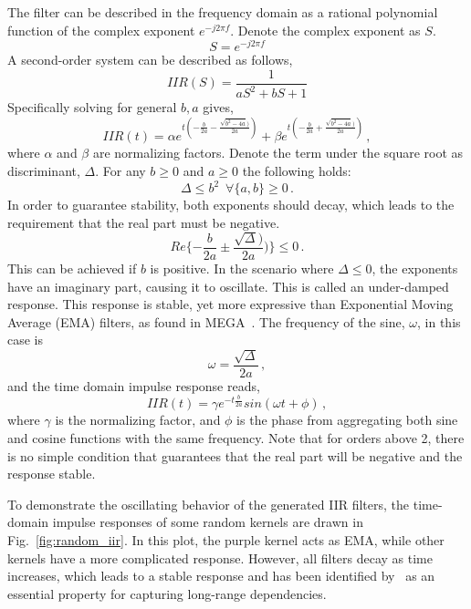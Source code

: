 \documentclass[11pt]{article}
\begin{document}
The filter can be described in the frequency domain as a rational polynomial function of the complex exponent $e^{-j2\pi f}$. Denote the complex exponent as $S$. 
\begin{equation}
    S = e^{-j2\pi f}
\end{equation}
A second-order system can be described as follows,
\begin{equation}
    IIR(S) = \frac{1}{aS^2 + bS + 1}
    \label{eq:iir_filter_s_plane}
\end{equation}
Specifically solving for general $b,a$ gives,
\begin{equation}
    IIR(t) = \alpha e^{t(-\frac{b}{2a}-\frac{\sqrt{b^2 - 4a})}{2a})} +\beta e^{t(-\frac{b}{2a} +\frac{\sqrt{b^2 - 4a})}{2a})}\,,
\end{equation}
where $\alpha$ and $\beta$ are normalizing factors. Denote the term under the square root as discriminant, $\Delta$. For any $b\geq0$ and $a\geq0$ the following holds:
\begin{equation}
    \Delta\leq b^2 \,\,\, \forall \{a,b\}\geq 0\,.
    \label{eq:delta_ineq}
\end{equation}
In order to guarantee stability, both exponents should decay, which leads to the requirement that the real part must be negative.
\begin{equation}
    Re\{-\frac{b}{2a}\pm\frac{\sqrt{\Delta})}{2a})\} \leq 0\,.
\end{equation}
This can be achieved if $b$ is positive. 
In the scenario where $\Delta \leq 0$, the exponents have an imaginary part, causing it to oscillate.  This is called an under-damped response.
This response is stable, yet more expressive than Exponential Moving Average (EMA) filters, as found in MEGA~\cite{ma2022mega}.
The frequency of the sine, $\omega$, in this case is
\begin{equation}
    \omega = \frac{\sqrt{\Delta}}{2a}\,,
    \label{eq:freq_sine}
\end{equation} 
and the time domain impulse response reads,
\begin{equation}
    IIR(t) = \gamma e^{-t\frac{b}{2a}}sin(\omega t+\phi)\,,
\end{equation}
where $\gamma$ is the normalizing factor, and $\phi$ is the phase from aggregating both sine and cosine functions with the same frequency. 
Note that for orders above 2, there is no simple condition that guarantees that the real part will be negative and the response stable.

To demonstrate the oscillating behavior of the generated IIR filters, the time-domain impulse responses of some random kernels are drawn in Fig.~\ref{fig:random_iir}. In this plot, the purple kernel acts as EMA, while other kernels have a more complicated response. However, all filters decay as time increases, which leads to a stable response and has been identified by~\citet{li2022makes} as an essential property for capturing long-range dependencies.
\end{document}
